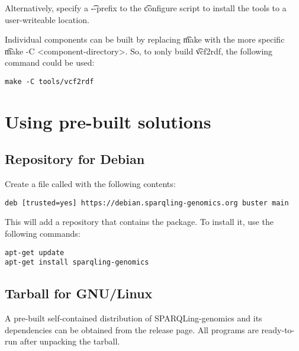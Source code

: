   Alternatively, specify a \t{-{}-prefix} to the \t{configure}
  script to install the tools to a user-writeable location.

  Individual components can be built by replacing \t{make} with the
  more specific \t{make -C <component-directory>}.  So, to \i{only}
  build \t{vcf2rdf}, the following command could be used:

\begin{siderules}
\begin{verbatim}
make -C tools/vcf2rdf
\end{verbatim}
\end{siderules}

\section{Using pre-built solutions}

\subsection{Repository for Debian}

Create a file called 
with the following contents:

\begin{siderules}
\begin{verbatim}
deb [trusted=yes] https://debian.sparqling-genomics.org buster main
\end{verbatim}
\end{siderules}

This will add a repository that contains the  package.
To install it, use the following commands:

\begin{siderules}
\begin{verbatim}
apt-get update
apt-get install sparqling-genomics
\end{verbatim}
\end{siderules}

\subsection{Tarball for GNU/Linux}

  A pre-built self-contained distribution of SPARQLing-genomics and
  its dependencies can be obtained from the release page.  All programs
  are ready-to-run after unpacking the tarball.

